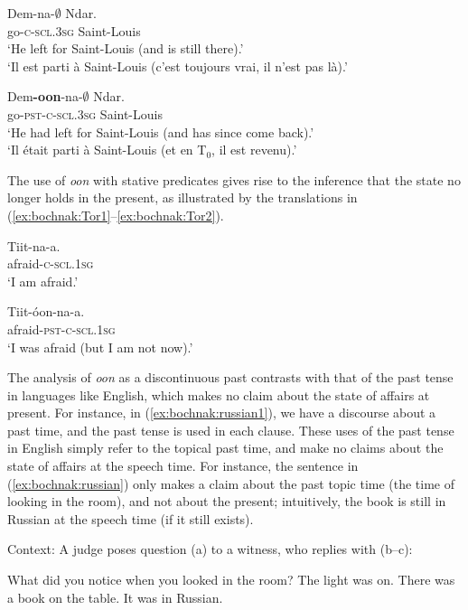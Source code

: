 \documentclass[output=paper,newtxmath,modfonts,nonflat,draftmode]{langsci/langscibook}
\begin{document}
\ea
\gll Dem-na-$\emptyset$ Ndar.\\
go-\textsc{c}-\textsc{scl.3sg} Saint-Louis\\
\glt `He left for Saint-Louis (and is still there).'\\
`Il est parti \`a Saint-Louis (c'est toujours vrai, il n'est
  pas l\`a).'\\\hfill\citep[279]{robert91approche}\label{ex:bochnak:Robert1}
\z

\ea
\gll Dem\textbf{-oon}-na-$\emptyset$ Ndar.\\
go-\textsc{pst}-\textsc{c}-\textsc{scl.3sg} Saint-Louis\\
\glt `He had left for Saint-Louis (and has since come
  back).'\\`Il \'etait parti \`a Saint-Louis (et en T$_0$,
  il est revenu).' \hfill \citep[279]{robert91approche}\label{ex:bochnak:Robert2}
\z


The use of \textit{oon} with stative predicates gives rise to the inference that the state no longer holds in the present, as illustrated by the translations in (\ref{ex:bochnak:Tor1}--\ref{ex:bochnak:Tor2}).

\ea
\gll Tiit-na-a.\\
afraid-\textsc{c}-\textsc{scl.1sg}\\
\glt `I am afraid.'\hfill\citep[25]{torrence12clause}\label{ex:bochnak:Tor1}
\z

\ea
\gll Tiit-\'oon-na-a.\\
afraid-\textsc{pst}-\textsc{c}-\textsc{scl.1sg}\\
\glt `I was afraid (but I am not now).'\hfill\citep[26]{torrence12clause}\label{ex:bochnak:Tor2}
\z

The analysis of \textit{oon} as a discontinuous past contrasts with that of the past tense in languages like English, which makes no claim about the state of affairs at present. For instance, in (\ref{ex:bochnak:russian1}), we have a discourse about a past time, and the past tense is used in each clause. These uses of the past tense in English simply refer to the topical past time, and make no claims about the state of affairs at the speech time. For instance, the sentence in (\ref{ex:bochnak:russian}) only makes a claim about the past topic time (the time of looking in the room), and not about the present; intuitively, the book is still in Russian at the speech time (if it still exists).

\begin{exe}
\ex\label{ex:bochnak:russian1} Context: A judge poses question (a) to a witness, who replies with (b--c):
\begin{xlist}
\ex What did you notice when you looked in the room?
\ex The light was on. There was a book on the table.
\ex\label{ex:bochnak:russian} It was in Russian. \hfill \citep{klein94time}
\end{xlist}
\end{exe}
\end{document}
